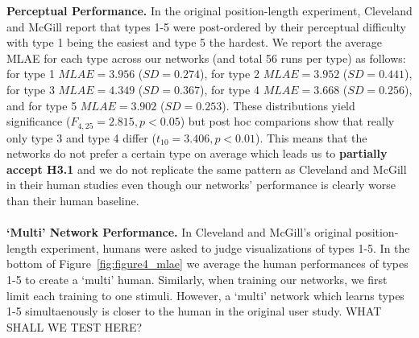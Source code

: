 \noindent\textbf{Perceptual Performance.} In the original position-length experiment, Cleveland and McGill report that types 1-5 were post-ordered by their perceptual difficulty with type 1 being the easiest and type 5 the hardest. We report the average MLAE for each type across our networks (and total 56 runs per type) as follows: 
for type 1 $MLAE= 3.956 $ ($SD= 0.274 $),
for type 2 $MLAE= 3.952 $ ($SD= 0.441 $),
for type 3  $MLAE= 4.349 $ ($SD= 0.367 $),
for type 4 $MLAE= 3.668 $ ($SD= 0.256 $), and 
for type 5 $MLAE= 3.902 $ ($SD= 0.253 $). These distributions yield significance ($F_{4,25}=2.815, p<0.05$) but post hoc comparions show that really only type 3 and type 4 differ ($t_{10}=3.406, p<0.01$). This means that the networks do not prefer a certain type on average which leads us to \textbf{partially accept H3.1} and we do not replicate the same pattern as Cleveland and McGill in their human studies even though our networks' performance is clearly worse than their human baseline.
\\~\\
\noindent\textbf{`Multi' Network Performance.} In Cleveland and McGill's original position-length experiment, humans were asked to judge visualizations of types 1-5. In the bottom of Figure~\ref{fig:figure4_mlae} we average the human performances of types 1-5 to create a `multi' human. Similarly, when training our networks, we first limit each training to one stimuli. However, a `multi' network which learns types 1-5 simultaenously is closer to the human in the original user study. WHAT SHALL WE TEST HERE?


